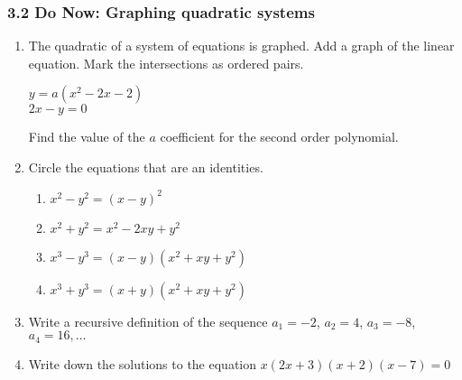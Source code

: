 \documentclass[12pt, twoside]{article}
\begin{document}
\subsubsection*{3.2 Do Now: Graphing quadratic systems}
\begin{enumerate}
  \item The quadratic of a system of equations is graphed. Add a graph of the linear equation. Mark the intersections as ordered pairs.

  \begin{multicols}{2}
    $y = a(x^2 - 2x - 2)$ \\
    \columnbreak
    $2x-y = 0$
    \end{multicols}
    Find the value of the $a$ coefficient for the second order polynomial. \vspace{2cm}

  \begin{center}
  \end{center}

\newpage
\item Circle the equations that are an identities.
    \begin{multicols}{2}
      \begin{enumerate}
        \item \(x^2 - y^2 = (x - y)^2\)
        \item \(x^2 + y^2 = x^2 - 2xy + y^2\)
        \item \(x^3 - y^3 = (x - y)(x^2 + xy + y^2)\)
        \item \(x^3 + y^3 = (x + y)(x^2 + xy + y^2)\)
      \end{enumerate}
    \end{multicols}

\item Write a recursive definition of the sequence $a_1 = -2$, $a_2 = 4$, $a_3 = -8$, $a_4 = 16, \ldots$ \vspace{2cm}
    
\item Write down the solutions to the equation $x(2x+3)(x +2)(x - 7) = 0$ \vspace{2cm} 


\end{enumerate}
\end{document}
